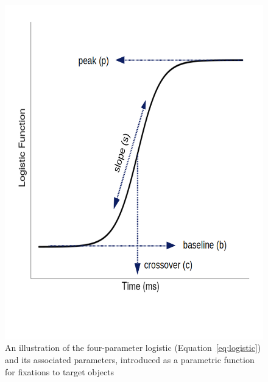\documentclass{article}
\begin{document}
\begin{figure}[H]
\centering
\includegraphics[scale=0.4]{logistic_label.png}
\caption{An illustration of the four-parameter logistic (Equation~\ref{eq:logistic}) and its associated parameters, introduced as a parametric function for fixations to target objects}
\label{fig:logistic_definition}
\end{figure}
\end{document}
